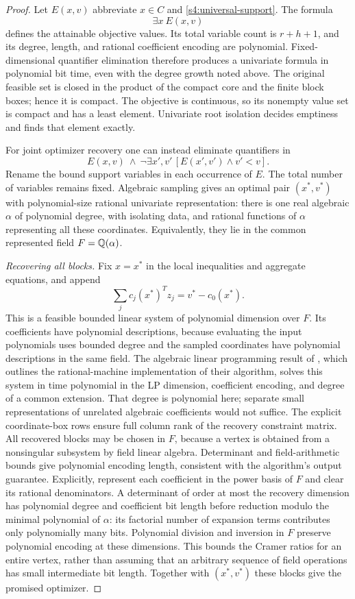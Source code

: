 \begin{proof}
Let $E(x,v)$ abbreviate $x\in C$ and
\eqref{s4:universal-support}. The formula
\[
 \exists x\ E(x,v)
\]
defines the attainable objective values. Its total variable count is
$r+h+1$, and its degree, length, and rational coefficient encoding
are polynomial. Fixed-dimensional quantifier elimination therefore
produces a univariate formula in polynomial bit time, even with the
degree growth noted above. The original feasible set is closed in the
product of the compact core and the finite block boxes; hence it is
compact. The objective is continuous, so its nonempty value set is
compact and has a least element. Univariate root isolation decides
emptiness and finds that element exactly.

For joint optimizer recovery one can instead eliminate quantifiers in
\begin{equation}
 E(x,v)\ \wedge\
 \neg\exists x',v'\,[E(x',v')\wedge v'<v].
 \label{s4:optimal-sample}
\end{equation}
Rename the bound support variables in each occurrence of $E$.
The total number of variables remains fixed. Algebraic sampling gives
an optimal pair $(x^*,v^*)$ with polynomial-size rational univariate
representation: there is one real algebraic $\alpha$ of polynomial
degree, with isolating data, and rational functions of $\alpha$
representing all these coordinates. Equivalently, they lie in the
common represented field $F=\mathbb Q(\alpha)$.

\emph{Recovering all blocks.}
Fix $x=x^*$ in the local inequalities and aggregate equations, and
append
\[
 \sum_jc_j(x^*)^Tz_j=v^*-c_0(x^*).
\]
This is a feasible bounded linear system of polynomial dimension over
$F$. Its coefficients have polynomial descriptions, because evaluating
the input polynomials uses bounded degree and the sampled coordinates
have polynomial descriptions in the same field. The algebraic linear
programming result of \citet[Section~5, Remark~1]{s4:adler1994},
which outlines the rational-machine implementation of their algorithm,
solves this system in time polynomial in the LP dimension, coefficient
encoding, and degree of a common extension. That degree is polynomial
here; separate small representations of unrelated algebraic
coefficients would not suffice. The explicit coordinate-box rows ensure
full column rank of the recovery constraint matrix. All recovered
blocks may be chosen in $F$, because a vertex is obtained from a
nonsingular subsystem by field linear algebra. Determinant and
field-arithmetic bounds give polynomial encoding length, consistent
with the algorithm's output guarantee. Explicitly, represent each
coefficient in the power basis of $F$ and clear its rational
denominators. A determinant of order at most the recovery dimension
has polynomial degree and coefficient bit length before reduction modulo
the minimal polynomial of $\alpha$: its factorial number of expansion
terms contributes only polynomially many bits. Polynomial division and
inversion in $F$ preserve polynomial encoding at these dimensions.
This bounds the Cramer ratios for an entire vertex, rather than
assuming that an arbitrary sequence of field operations has small
intermediate bit length. Together with $(x^*,v^*)$ these
blocks give the promised optimizer.


\end{proof}
